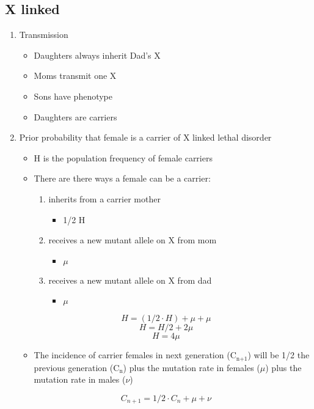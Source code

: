 \documentclass{scrartcl}
\begin{document}
\subsection{X linked}
\label{sec:org43f7e02}
\begin{enumerate}
\item Transmission
\label{sec:orgc149c4d}
\begin{itemize}
\item Daughters always inherit Dad's X
\item Moms transmit one X
\item Sons have phenotype
\item Daughters are carriers
\end{itemize}

\item Prior probability that female is a carrier of X linked lethal disorder
\label{sec:org35d66ce}
\begin{itemize}
\item H is the population frequency of female carriers
\item There are there ways a female can be a carrier:
\begin{enumerate}
\item inherits from a carrier mother
\begin{itemize}
\item 1/2  H
\end{itemize}
\item receives a new mutant allele on X from mom
\begin{itemize}
\item \(\mu\)
\end{itemize}
\item receives a new mutant allele on X from dad
\begin{itemize}
\item \(\mu\)
\end{itemize}
\end{enumerate}
\end{itemize}
\[H = (1/2 \cdot H) + \mu + \mu \]
\[H = H/2 +2\mu \]
\[H = 4\mu \]

\begin{itemize}
\item The incidence of carrier females in next generation (C\(_{\text{n+1}}\)) will
be 1/2 the previous generation (C\(_{\text{n}}\)) plus the mutation rate in
females (\(\mu\)) plus the mutation rate in males (\(\nu\))
\end{itemize}

\[C_{n+1} = 1/2 \cdot C_n + \mu + \nu \]


\end{enumerate}
\end{document}
